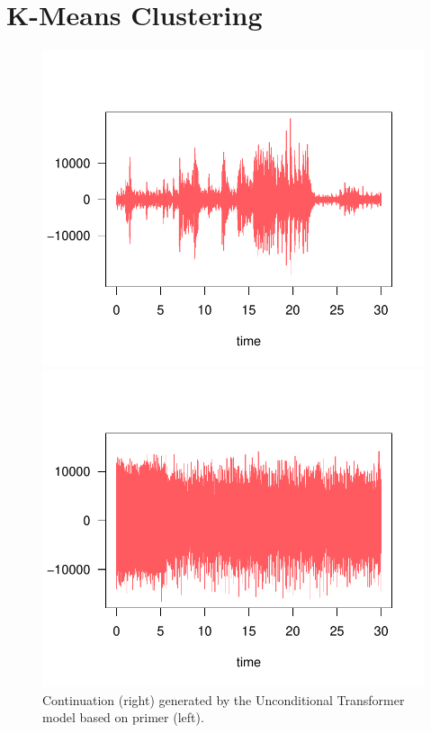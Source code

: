 \documentclass[twocolumn]{article}
\begin{document}
\section{K-Means Clustering}
\begin{figure}[htbp]
  \centering
  \begin{minipage}[t]{0.5\columnwidth}
    \centering
    \includegraphics[width=\linewidth]{images/audio_jazz.pdf}
  \end{minipage}\hfill
  \begin{minipage}[t]{0.5\columnwidth}
    \centering
    \includegraphics[width=\linewidth]{images/audio_metal.pdf}
  \end{minipage}
  \caption{Continuation (right) generated by the Unconditional Transformer model based on primer (left).}
  \label{fig:groupedImages}
\end{figure}
\end{document}
